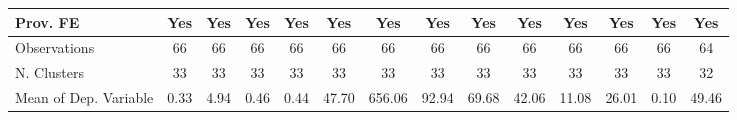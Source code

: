 {\begin{tabular}{l*{13}{c}}
Prov. FE            &         Yes   &         Yes   &         Yes   &         Yes   &         Yes   &         Yes   &         Yes   &         Yes   &         Yes   &         Yes   &         Yes   &         Yes   &         Yes   \\
\hline
Observations        &          66   &          66   &          66   &          66   &          66   &          66   &          66   &          66   &          66   &          66   &          66   &          66   &          64   \\
N. Clusters         &          33   &          33   &          33   &          33   &          33   &          33   &          33   &          33   &          33   &          33   &          33   &          33   &          32   \\
Mean of Dep. Variable&        0.33   &        4.94   &        0.46   &        0.44   &       47.70   &      656.06   &       92.94   &       69.68   &       42.06   &       11.08   &       26.01   &        0.10   &       49.46   \\
\hline\hline
\end{tabular}
}
